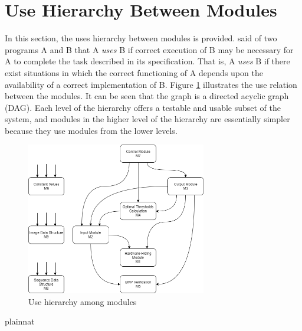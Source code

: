 \documentclass[12pt, titlepage]{article}
\begin{document}
\section{Use Hierarchy Between Modules} \label{SecUse}

In this section, the uses hierarchy between modules is
provided. \citet{Parnas1978} said of two programs A and B that A {\em uses} B
if correct execution of B may be necessary for A to complete the task described
in
its specification. That is, A {\em uses} B if there exist situations in which
the correct functioning of A depends upon the availability of a correct
implementation of B.  Figure \ref{FigUH} illustrates the use relation between
the modules. It can be seen that the graph is a directed acyclic graph
(DAG). Each level of the hierarchy offers a testable and usable subset of the
system, and modules in the higher level of the hierarchy are essentially
simpler because they use modules from the lower levels.

\begin{figure}[H]
\centering
\includegraphics[width=0.7\textwidth]{UsesHierarchy.png}
\caption{Use hierarchy among modules}
\label{FigUH}
\end{figure}


 {plainnat}

\end{document}

